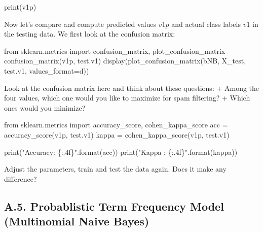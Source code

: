 \documentclass[
  letterpaper,
]{scrbook}
\newenvironment{Shaded}{\begin{snugshade}}{\end{snugshade}}
\newcommand{\BuiltInTok}[1]{\textcolor[rgb]{0.00,0.23,0.31}{#1}}
\newcommand{\ImportTok}[1]{\textcolor[rgb]{0.00,0.46,0.62}{#1}}
\newcommand{\NormalTok}[1]{\textcolor[rgb]{0.00,0.23,0.31}{#1}}
\newcommand{\OperatorTok}[1]{\textcolor[rgb]{0.37,0.37,0.37}{#1}}
\newcommand{\SpecialCharTok}[1]{\textcolor[rgb]{0.37,0.37,0.37}{#1}}
\newcommand{\StringTok}[1]{\textcolor[rgb]{0.13,0.47,0.30}{#1}}
\begin{document}
\begin{Shaded}
\begin{Highlighting}[]
\BuiltInTok{print}\NormalTok{(v1p)}
\end{Highlighting}
\end{Shaded}

Now let's compare and compute predicted values \(v1p\) and actual class
labels \(v1\) in the testing data. We first look at the confusion
matrix:

\begin{Shaded}
\begin{Highlighting}[]
\ImportTok{from}\NormalTok{ sklearn.metrics }\ImportTok{import}\NormalTok{ confusion\_matrix, plot\_confusion\_matrix}
\NormalTok{confusion\_matrix(v1p, test.v1)}
\NormalTok{display(plot\_confusion\_matrix(bNB, X\_test, test.v1, values\_format}\OperatorTok{=}\StringTok{\textquotesingle{}d\textquotesingle{}}\NormalTok{))}
\end{Highlighting}
\end{Shaded}

Look at the confusion matrix here and think about these questions: +
Among the four values, which one would you like to maximize for spam
filtering? + Which ones would you minimize?

\begin{Shaded}
\begin{Highlighting}[]
\ImportTok{from}\NormalTok{ sklearn.metrics }\ImportTok{import}\NormalTok{ accuracy\_score, cohen\_kappa\_score }
\NormalTok{acc }\OperatorTok{=}\NormalTok{ accuracy\_score(v1p, test.v1)}
\NormalTok{kappa }\OperatorTok{=}\NormalTok{ cohen\_kappa\_score(v1p, test.v1)}

\BuiltInTok{print}\NormalTok{(}\StringTok{"Accuracy: }\SpecialCharTok{\{:.4f\}}\StringTok{"}\NormalTok{.}\BuiltInTok{format}\NormalTok{(acc))}
\BuiltInTok{print}\NormalTok{(}\StringTok{"Kappa   : }\SpecialCharTok{\{:.4f\}}\StringTok{"}\NormalTok{.}\BuiltInTok{format}\NormalTok{(kappa))}
\end{Highlighting}
\end{Shaded}

Adjust the parameters, train and test the data again. Does it make any
difference?

\subsection*{A.5. Probablistic Term Frequency Model (Multinomial Naive
Bayes)}\label{a.5.-probablistic-term-frequency-model-multinomial-naive-bayes}
\end{document}

